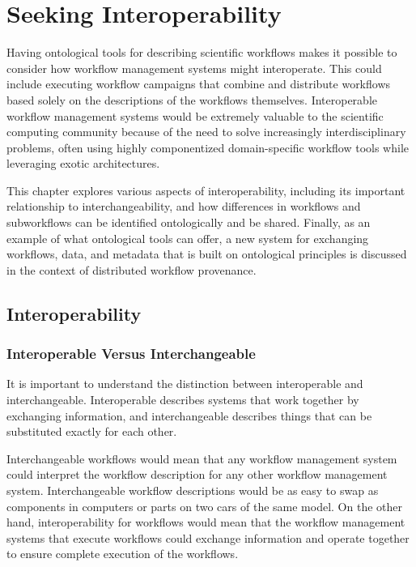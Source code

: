 \chapter{Seeking Interoperability} \label{ch:interoperability}

Having ontological tools for describing scientific workflows makes it possible
to consider how workflow management systems might interoperate. This could
include executing workflow campaigns that combine and distribute workflows
based solely on the descriptions of the workflows themselves. Interoperable
workflow management systems would be extremely valuable to the scientific
computing community because of the need to solve increasingly interdisciplinary
problems, often using highly componentized domain-specific workflow tools while
leveraging exotic architectures.

This chapter explores various aspects of interoperability, including its
important relationship to interchangeability, and how differences in workflows
and subworkflows can be identified ontologically and be shared. Finally, as an
example of what ontological tools can offer, a new system for exchanging
workflows, data, and metadata that is built on ontological principles is
discussed in the context of distributed workflow provenance.

\section{Interoperability}


\subsection{Interoperable Versus Interchangeable}

It is important to understand the distinction between interoperable and
interchangeable. Interoperable describes systems that work together by
exchanging information, and interchangeable describes things that can be
substituted exactly for each other.

Interchangeable workflows would mean that any workflow management system could
interpret the workflow description for any other workflow management system.
Interchangeable workflow descriptions would be as easy to swap as components in
computers or parts on two cars of the same model. On the other hand,
interoperability for workflows would mean that the workflow management systems
that execute workflows could exchange information and operate together to
ensure complete execution of the workflows.

